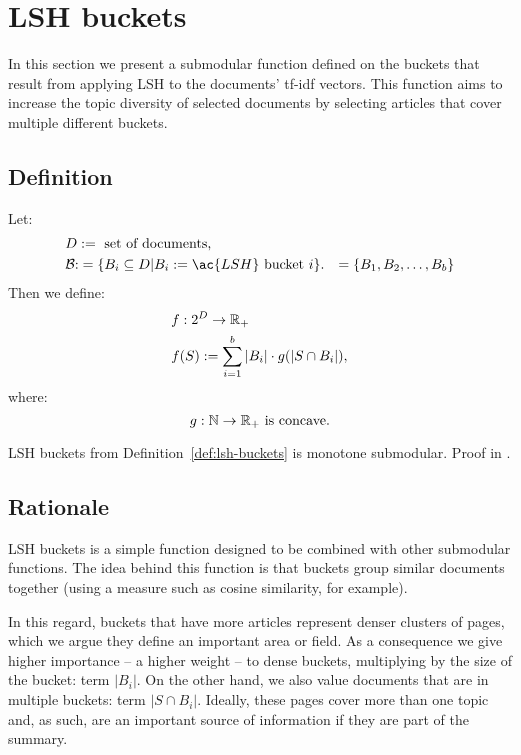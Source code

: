 \section{LSH buckets}
\label{sec:lsh-buckets}

In this section we present a submodular function defined on the buckets that
result from applying \acl{LSH} to the documents' tf-idf vectors. This function
aims to increase the topic diversity of selected documents by selecting
articles that cover multiple different buckets.

\subsection{Definition}

\begin{definition}
  \label{def:lsh-buckets}
  Let:
  \begin{align*}
    &D := \text{ set of documents,} \\
    &\B
    \begin{aligned}[t]
      :&= \{B_i \subseteq D | B_i := \ac{LSH} \text{ bucket } i\}.
      &= \{B_1, B_2, \ldots, B_b\} \\
    \end{aligned}
  \end{align*}
  Then we define:
  \begin{align*}
    &f : 2^D \to \mathbb{R}_+ \\
    &f(S) := \sum_{i=1}^b |B_i| \cdot g(|S \cap B_i|),
  \end{align*}
  where:
    \[g : \mathbb{N} \to \mathbb{R}_+ \text{ is concave.}\]
\end{definition}

\begin{proposition}
  \label{prop:lsh-buckets}
  \ac{LSH} buckets from Definition~\ref{def:lsh-buckets} is monotone
  submodular. Proof in .
\end{proposition}

\subsection{Rationale}

\ac{LSH} buckets is a simple function designed to be combined with other
submodular functions. The idea behind this function is that buckets group
similar documents together (using a measure such as cosine similarity, for
example).

In this regard, buckets that have more articles represent denser clusters of
pages, which we argue they define an important area or field.
As a consequence we give higher importance -- a higher weight -- to dense
buckets, multiplying by the size of the bucket: term \(|B_i|\).
On the other hand, we also value documents that are in multiple buckets: term
\(|S \cap B_i|\).
Ideally, these pages cover more than one topic and, as such, are an important
source of information if they are part of the summary.

